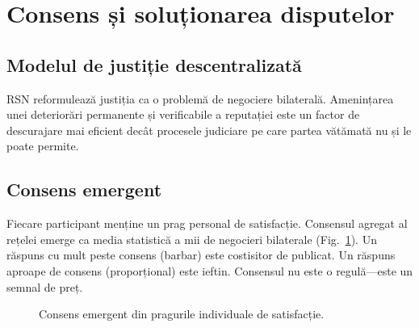 \documentclass[11pt,a4paper,twocolumn]{article}
\begin{document}
\section{Consens și soluționarea disputelor}

\subsection{Modelul de justiție descentralizată}

RSN reformulează justiția ca o problemă de negociere bilaterală. Amenințarea unei deteriorări permanente și verificabile a reputației este un factor de descurajare mai eficient decât procesele judiciare pe care partea vătămată nu și le poate permite.

\subsection{Consens emergent}

Fiecare participant menține un prag personal de satisfacție. Consensul agregat al rețelei emerge ca media statistică a mii de negocieri bilaterale (Fig.~\ref{fig:consensus}). Un răspuns cu mult peste consens (barbar) este costisitor de publicat. Un răspuns aproape de consens (proporțional) este ieftin. Consensul nu este o regulă---este un semnal de preț.

\begin{figure}[ht]
\centering
{}
\caption{Consens emergent din pragurile individuale de satisfacție.}
\label{fig:consensus}
\end{figure}
\end{document}
